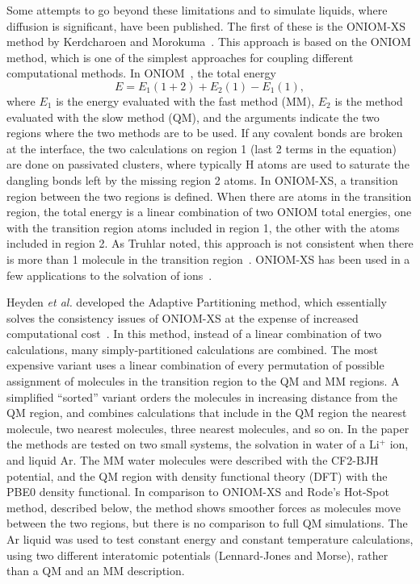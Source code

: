 \documentclass[11pt]{revtex4}
\begin{document}
Some attempts to go beyond these limitations and to simulate liquids,
where diffusion is significant, have been published.  The first of
these is the ONIOM-XS method by Kerdcharoen and
Morokuma~\cite{kerdcharoen_chem_phys_lett_2002a}.  This approach is
based on the ONIOM method, which is one of the simplest approaches
for coupling different computational methods.  In ONIOM~\cite{svensson_j_phys_chem_1996a},
the total energy
$$ E = E_1(1+2) + E_2(1) - E_1(1), $$
where $E_1$ is the energy evaluated with the fast method (MM), $E_2$ is
the method evaluated with the slow method (QM), and the arguments
indicate the two regions where the two methods are to be used.  If
any covalent bonds are broken at the interface, the two calculations
on region 1 (last 2 terms in the equation) are done on passivated
clusters, where typically H atoms are used to saturate the dangling
bonds left by the missing region 2 atoms.  In ONIOM-XS, a transition
region between the two regions is defined.  When there are atoms
in the transition region, the total energy is a linear combination
of two ONIOM total energies, one with the transition region atoms
included in region 1, the other with the atoms included in region
2.  As Truhlar noted, this approach is not consistent when there
is more than 1 molecule in the transition
region~\cite{heyden_j_phys_chem_b_2007a}.  ONIOM-XS has been used
in a few applications to the solvation of
ions~\cite{kerdcharoen_j_chem_phys_2003a,hofer_j_amer_chem_soc_2005a}.

Heyden {\it et al.} developed the Adaptive Partitioning method,
which essentially solves the consistency issues of ONIOM-XS at the
expense of increased computational cost~\cite{heyden_j_phys_chem_b_2007a}.
In this method, instead of a linear combination of two calculations,
many simply-partitioned calculations are combined.  The most expensive
variant uses a linear combination of every permutation of possible
assignment of molecules in the transition region to the QM and MM
regions.  A simplified ``sorted'' variant orders the molecules in
increasing distance from the QM region, and combines calculations
that include in the QM region the nearest molecule, two nearest
molecules, three nearest molecules, and so on.  In the paper the
methods are tested on two small systems, the solvation in water of
a Li$^+$ ion, and liquid Ar.  The MM water molecules were described
with the CF2-BJH potential, and the QM region with density functional
theory (DFT) with the PBE0 density functional.  In comparison to
ONIOM-XS and Rode's Hot-Spot method, described below, the method
shows smoother forces as molecules move between the two regions,
but there is no comparison to full QM simulations.  The Ar liquid
was used to test constant energy and constant temperature calculations,
using two different interatomic potentials (Lennard-Jones and Morse),
rather than a QM and an MM description.
\end{document}
